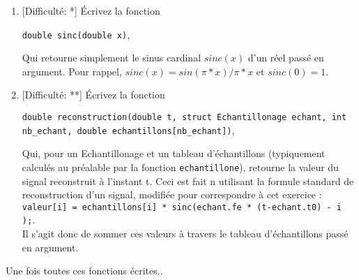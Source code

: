 \documentclass[11pt]{article}
\begin{document}
\begin{enumerate}
\item \textcolor{mygreen}{[Difficulté: *]}
Écrivez la fonction
\begin{center} 
\texttt{double sinc(double x)}, 
\end{center}
Qui retourne simplement le sinus cardinal $sinc(x)$ d'un réel passé en argument. Pour rappel, $sinc(x) = sin(\pi * x) / \pi*x$ et $sinc(0) = 1$.

\item \textcolor{mygreen}{[Difficulté: **]}
Écrivez la fonction
\begin{center} 
\texttt{double reconstruction(double t, struct Echantillonage echant, int nb\_echant, double echantillons[nb\_echant])}, 
\end{center}
Qui, pour un Echantillonage et un tableau d'échantillons (typiquement calculés au préalable par la fonction \texttt{echantillone}), retourne la valeur du signal reconstruit à l'instant t. Ceci est fait n utilisant la formule standard de reconstruction d'un signal, modifiée pour correspondre à cet exercice :\\
\texttt{valeur[i] = echantillons[i] * sinc(echant.fe * (t-echant.t0) - i );}.\\ 
Il s'agit donc de  sommer ces valeurs à travers le tableau d'échantillons passé en argument.

\end{enumerate}

Une fois toutes ces fonctions écrites.. 
\end{document}
